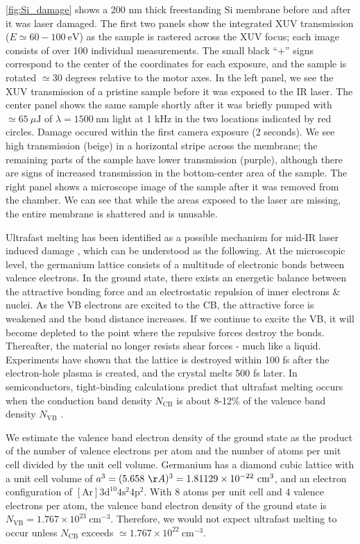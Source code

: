 \cref{fig:Si_damage} shows a 200 nm thick freestanding Si membrane before and after it was laser damaged. The first two panels show the integrated XUV transmission ($E \simeq 60-100 \ \textrm{eV}$) as the sample is rastered across the XUV focus; each image consists of over 100 individual measurements. The small black ``+'' signs correspond to the center of the coordinates for each exposure, and the sample is rotated $\simeq 30$ degrees relative to the motor axes. In the left panel, we see the XUV transmission  of a pristine sample before it was exposed to the IR laser. The center panel shows the same sample shortly after it was briefly pumped with $\simeq 65 \ \mu \textrm{J}$ of $\lambda=1500 \ \textrm{nm}$ light at 1 kHz in the two locations indicated by red circles. Damage occured within the first camera exposure (2 seconds). We see high transmission (beige) in a horizontal stripe across the membrane; the remaining parts of the sample have lower transmission (purple), although there are signs of increased transmission in the bottom-center area of the sample. The right panel shows a microscope image of the sample after it was removed from the chamber. We can see that while the areas exposed to the laser are missing, the entire membrane is shattered and is unusable.

Ultrafast melting has been identified as a possible mechanism for mid-IR laser induced damage \cite{austinSemiconductorSurfaceModification2017,austinFemtosecondLaserDamage2018}, which can be understood as the following. At the microscopic level, the germanium lattice consists of a multitude of electronic bonds between valence electrons. In the ground state, there exists an energetic balance between the attractive bonding force and an electrostatic repulsion of inner electrons \& nuclei. As the VB electrons are excited to the CB, the attractive force is weakened and the bond distance increases. If we continue to excite the VB, it will become depleted to the point where the repulsive forces destroy the bonds. Thereafter, the material no longer resists shear forces - much like a liquid. Experiments have shown that the lattice is destroyed within 100 fs after the electron-hole plasma is created, and the crystal melts 500 fs later. In semiconductors, tight-binding calculations predict that ultrafast melting occurs when the conduction band density $N_{\textrm{CB}}$ is about 8-12\% of the valence band density $N_{\textrm{VB}}$ \cite{stampfliTheoryLaserinducedInstability1990,austinFemtosecondLaserDamage2018}.

We estimate the valence band electron density of the ground state as the product of the number of valence electrons per atom and the number of atoms per unit cell divided by the unit cell volume. Germanium has a diamond cubic lattice with a unit cell volume of ${a^3 = (5.658 \ \AA)^3 = 1.81129 \times 10^{-22} \ \textrm{cm}^3}$, and an electron configuration of ${[\textrm{Ar}] 3\textrm{d}^{10 }4\textrm{s}^2 4\textrm{p}^2}$. With 8 atoms per unit cell and 4 valence electrons per atom, the valence band electron density of the ground state is $N_{\textrm{VB}} = 1.767 \times 10^{23} \ \textrm{cm}^{-3}$. Therefore, we would not expect ultrafast melting to occur unless $N_{\textrm{CB}}$ exceeds $\simeq 1.767 \times 10^{22} \ \textrm{cm}^{-3}$.

